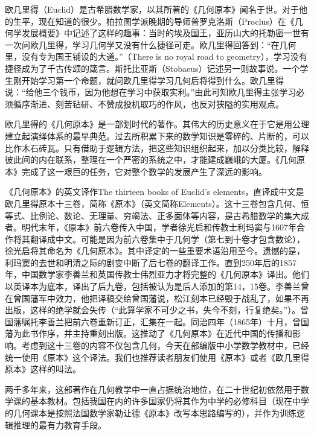 \documentclass[b5paper]{ctexart}
\begin{document}
\begin{mdframed}

欧几里得（Euclid）是古希腊数学家，以其所著的《几何原本》闻名于世。对于他的生平，现在知道的很少。柏拉图学派晚期的导师普罗克洛斯（Proclus）在《几何学发展概要》中记述了这样的趣事：当时的埃及国王，亚历山大的托勒密一世有一次问欧几里得，学习几何学又没有什么捷径可走。欧几里得回答到：“在几何里，没有专为国王铺设的大道。\footnotemark”（There is no royal road to geometry），学习没有捷径成为了千古传颂的箴言。斯托比亚斯（Stobaeus）记述另一则故事说。一个学生刚开始学习第一个命题，就问欧几里得学习几何后将得到什么。欧几里得说：“给他三个钱币，因为他想在学习中获取实利。”由此可知欧几里得主张学习必须循序渐进、刻苦钻研、不赞成投机取巧的作风，也反对狭隘的实用观点\cite{Elements}。

欧几里得的《几何原本》是一部划时代的著作。其伟大的历史意义在于它是用公理建立起演绎体系的最早典范。过去所积累下来的数学知识是零碎的、片断的，可以比作木石砖瓦。只有借助于逻辑方法，把这些知识组织起来，加以分类比较，解释彼此间的内在联系，整理在一个严密的系统之中，才能建成巍峨的大厦。《几何原本》完成了这一艰巨的任务，它对整个数学的发展产生了深远的影响。

《几何原本》的英文译作The thirteen books of Euclid's elements，直译成中文是欧几里得原本十三卷，简称《原本》（英文简称Elements）。这十三卷包含几何、恒等式、比例论、数论、无理量、穷竭法、正多面体等内容，是古希腊数学的集大成者。明代末年，《原本》前六卷传入中国，学者徐光启和传教士利玛窦与1607年合作将其翻译成中文。可能是因为前六卷集中于几何学（第七到十卷才包含数论），徐光启将其命名为《几何原本》。其中译定的一些重要术语沿用至今。遗憾的是，利玛窦的去世和明清之际的剧变中断了后七卷的翻译工作。直到250年后的1857年，中国数学家李善兰和英国传教士伟烈亚力才将完整的《几何原本》译出。他们以英译本为底本，译出了后九卷，包括被认为是后人添加的第14，15卷。李善兰曾在曾国藩军中效力，他把译稿交给曾国藩说，松江刻本已经毁于战乱了，如果不再出版，这样的绝学就会失传（“此算学家不可少之书，失今不刻，行复绝矣。”）。曾国藩嘱托李善兰把前六卷重新订正，汇集在一起。同治四年（1865年）十月，曾国藩为此书作序，并主持重刻出版。这推动了《几何原本》在近代中国的传播和影响。考虑到这十三卷的内容不仅包含几何，今天在部编版中小学数学教材中，已经统一使用《原本》这个译法。我们也推荐读者朋友们使用《原本》或者《欧几里得原本》这样的叫法。

两千多年来，这部著作在几何教学中一直占据统治地位，在二十世纪初依然用于数学课的基本教材。包括我国在内的许多国家仍将其作为中学的必修科目（现在中学的几何课本是按照法国数学家勒让德《原本》改写本思路编写的），并作为训练逻辑推理的最有力教育手段\cite{HanXueTao16}。
\end{mdframed}
\end{document}
